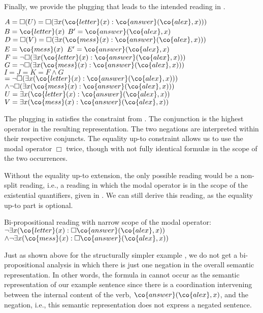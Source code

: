 \documentclass[output=paper]{langsci/langscibook}
\begin{document}
Finally, we provide the plugging that leads to the intended reading in .

\ea \label{plug-brauch-bi}
$A = \Box(U) = \Box(\exists x (\co{letter}(x) : \co{answer}(\co{alex},x)))$\\
$B = \co{letter}(x)$
\qquad $B' = \co{answer}(\co{alex},x)$\\
$D = \Box(V) = \Box(\exists x (\co{mess}(x) : \co{answer}(\co{alex},x)))$\\
$E= \co{mess}(x)$
\qquad $E'= \co{answer}(\co{alex},x)$\\
$F= \lnot \Box(\exists x (\co{letter}(x) : \co{answer}(\co{alex},x)))$\\
$G= \lnot \Box(\exists x (\co{mess}(x) : \co{answer}(\co{alex},x)))$\\
$I=J=K= F\land G$\\
\hspace*{3em} $= 
\lnot \Box(\exists x (\co{letter}(x) : \co{answer}(\co{alex},x)))$\\
\hspace*{\fill} $\land 
\lnot \Box(\exists x (\co{mess}(x) : \co{answer}(\co{alex},x)))
$\\
$U= \exists x (\co{letter}(x) : \co{answer}(\co{alex},x))$\\
$V= \exists x (\co{mess}(x) : \co{answer}(\co{alex},x))$
\z 

The plugging in  satisfies the constraint from .
The conjunction is the highest operator in the resulting representation. The two negations are interpreted within their respective conjuncts. The equality up-to constraint allows us to use the modal operator $\Box$ twice, though with not fully identical formulæ in the scope of the two occurrences.


Without the equality up-to extension,
the only possible reading would be a non-split reading, i.e., a reading in which the modal operator is in the scope of the existential quantifiers, given in .
We can still derive this reading, as the equality up-to part is optional.

\ea \label{brauch-brief-mail-biWide}
Bi-propositional reading with narrow scope of the modal operator:\\
$\lnot \exists x (\co{letter}(x) : \Box \co{answer}(\co{alex}, x))$%
$\land 
\lnot \exists x (\co{mess}(x) : \Box \co{answer}(\co{alex}, x)) 
$
\z 

Just as shown above for the structurally simpler example , we do not get a bi-propositional analysis in which there is just one negation in the overall semantic representation. In other words, the formula in  cannot occur as the semantic representation of our example sentence since there is a coordination intervening between the internal content of the verb, $\co{answer}(\co{alex},x)$, and the negation, i.e., this semantic representation does not express a negated sentence.
\end{document}
